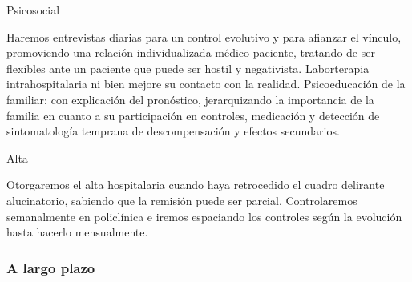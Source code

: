 \documentclass{scrbook}
\begin{document}
Psicosocial

Haremos entrevistas diarias para un control evolutivo y para afianzar el vínculo, promoviendo una relación individualizada médico-paciente, tratando de ser flexibles ante un paciente que puede ser hostil y negativista. Laborterapia intrahospitalaria ni bien mejore su contacto con la realidad. Psicoeducación de la familiar: con explicación del pronóstico, jerarquizando la importancia de la familia en cuanto a su participación en controles, medicación y detección de sintomatología temprana de descompensación y efectos secundarios.

Alta

Otorgaremos el alta hospitalaria cuando haya retrocedido el cuadro delirante alucinatorio, sabiendo que la remisión puede ser parcial. Controlaremos semanalmente en policlínica e iremos espaciando los controles según la evolución hasta hacerlo mensualmente.

\subsubsection*{A largo plazo}
\end{document}
